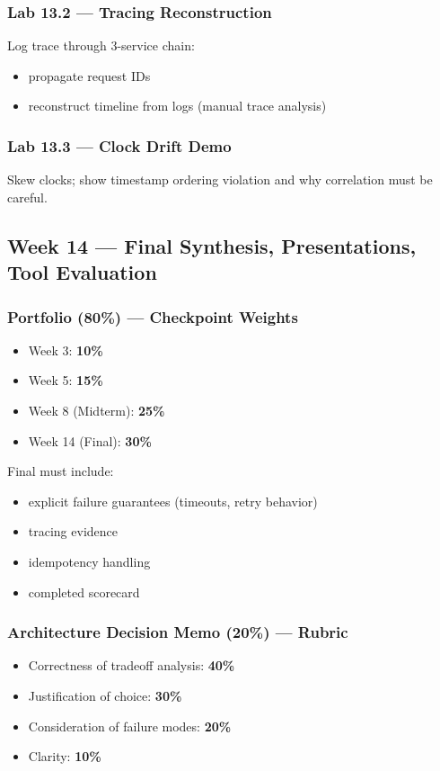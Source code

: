 \documentclass[11pt,a4paper]{article}
\begin{document}
	\subsubsection*{Lab 13.2 --- Tracing Reconstruction}
	Log trace through 3-service chain:
	\begin{itemize}[leftmargin=*]
		\item propagate request IDs
		\item reconstruct timeline from logs (manual trace analysis)
	\end{itemize}
	
	\subsubsection*{Lab 13.3 --- Clock Drift Demo}
	Skew clocks; show timestamp ordering violation and why correlation must be careful.
	
	\subsection*{Week 14 --- Final Synthesis, Presentations, Tool Evaluation}
	
	\subsubsection*{Portfolio (80\%) --- Checkpoint Weights}
	\begin{itemize}[leftmargin=*]
		\item Week 3: \textbf{10\%}
		\item Week 5: \textbf{15\%}
		\item Week 8 (Midterm): \textbf{25\%}
		\item Week 14 (Final): \textbf{30\%}
	\end{itemize}
	
	Final must include:
	\begin{itemize}[leftmargin=*]
		\item explicit failure guarantees (timeouts, retry behavior)
		\item tracing evidence
		\item idempotency handling
		\item completed scorecard
	\end{itemize}
	
	\subsubsection*{Architecture Decision Memo (20\%) --- Rubric}
	\begin{itemize}[leftmargin=*]
		\item Correctness of tradeoff analysis: \textbf{40\%}
		\item Justification of choice: \textbf{30\%}
		\item Consideration of failure modes: \textbf{20\%}
		\item Clarity: \textbf{10\%}
	\end{itemize}
	
\end{document}
